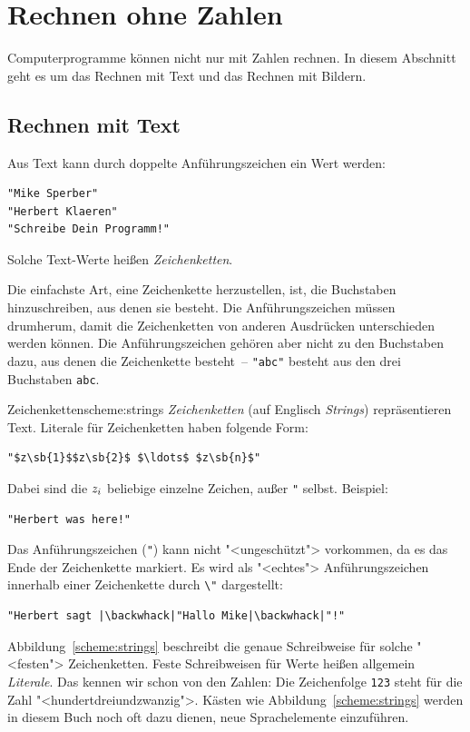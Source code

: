 \section{Rechnen ohne Zahlen}

Computerprogramme können nicht nur mit Zahlen rechnen.  In diesem
Abschnitt geht es um das Rechnen mit Text und das Rechnen mit Bildern.

\subsection{Rechnen mit Text}

Aus Text kann durch doppelte Anführungszeichen ein Wert werden:
%
\begin{lstlisting}
"Mike Sperber"
"Herbert Klaeren"
"Schreibe Dein Programm!"
\end{lstlisting}
%
Solche Text-Werte heißen \textit{Zeichenketten}.

Die einfachste Art, eine Zeichenkette herzustellen, ist, die
Buchstaben hinzuschreiben, aus denen sie besteht.  Die
Anführungszeichen müssen drumherum, damit die Zeichenketten von anderen
Ausdrücken unterschieden werden können.  Die Anführungszeichen gehören aber nicht
zu den Buchstaben dazu, aus denen die Zeichenkette besteht~--
\lstinline{"abc"} besteht aus den drei Buchstaben \texttt{abc}.

\begin{feature}{Zeichenketten}{scheme:strings}
\textit{Zeichenketten} (auf Englisch
\textit{Strings}) repräsentieren Text.
Literale für Zeichenketten haben folgende Form:
%
\begin{lstlisting}
"$z\sb{1}$$z\sb{2}$ $\ldots$ $z\sb{n}$"
\end{lstlisting}
%
Dabei sind die \(z\sb{i}\) beliebige einzelne Zeichen, außer \lstinline{"} selbst.
Beispiel:
%
\begin{lstlisting}
"Herbert was here!"
\end{lstlisting}
%
Das Anführungszeichen (\lstinline{"}) kann nicht "<ungeschützt"> vorkommen, da es das Ende der
Zeichenkette markiert. Es wird als "<echtes"> Anführungszeichen innerhalb einer Zeichenkette
durch \lstinline{\"} dargestellt:
%
\begin{lstlisting}
"Herbert sagt |\backwhack|"Hallo Mike|\backwhack|"!"
\end{lstlisting}
\end{feature}

Abbildung~\ref{scheme:strings} beschreibt die genaue Schreibweise für
solche "<festen"> Zeichenketten.  Feste Schreibweisen für Werte heißen
allgemein \textit{Literale}.  Das kennen wir schon von
den Zahlen: Die Zeichenfolge \lstinline{123} steht für die Zahl
"<hundertdreiundzwanzig">.  Kästen wie Abbildung~\ref{scheme:strings}
werden in diesem Buch noch oft dazu dienen, neue Sprachelemente
einzuführen.

